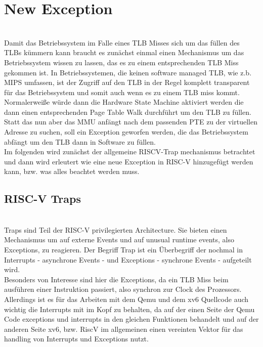 \section{New Exception}
\\
Damit das Betriebssystem im Falle eines TLB Misses sich um das füllen des TLBs kümmern kann
braucht es zunächst einmal einen Mechanismus um das Betriebssystem wissen zu lassen,
das es zu einem entsprechenden TLB Miss gekommen ist. In Betriebssystemen, die keinen
software managed TLB, wie z.b. MIPS \cite{MIPSArchitectureProgrammers2016} umfassen, ist der
Zugriff auf den TLB in der Regel komplett transparent für das Betriebssystem und somit auch wenn
es zu einem TLB miss kommt. Normalerweiße würde dann die Hardware State Machine aktiviert werden
die dann einen entsprechenden Page Table Walk durchführt um den TLB zu füllen.
\\
Statt das nun aber das MMU anfängt nach dem passenden PTE zu der virtuellen Adresse zu suchen,
soll ein Exception geworfen werden, die das Betriebssystem abfängt um den TLB dann in Software
zu füllen.\\
Im folgenden wird zunächst der allgemeine RISCV-Trap mechanismus betrachtet und dann
wird erleutert wie eine neue Exception in RISC-V hinzugefügt werden kann, bzw. was alles beachtet
werden muss.

\subsection{RISC-V Traps}
\\
Traps sind Teil der RISC-V privilegierten Architecture. Sie bieten einen Mechanismus
um auf externe Events und auf unusual runtime events, also Exceptions, zu reagieren\cite{riscvreader}.
Der Begriff Trap ist ein Überbegriff der nochmal in Interrupts - asynchrone Events - und
Exceptions - synchrone Events - aufgeteilt wird.\\
Besonders von Interesse sind hier die Exceptions, da ein TLB Miss beim ausführen einer Instruktion
passiert, also synchron zur Clock des Prozessors. Allerdings ist es für das Arbeiten mit
dem Qemu und dem xv6 Quellcode auch wichtig die Interrupts mit im Kopf zu behalten, da auf der
einen Seite der Qemu Code exceptions und interrupts in den gleichen Funktionen behandelt und
auf der anderen Seite xv6, bzw. RiscV im allgemeinen einen vereinten Vektor für das handling
von Interrupts und Exceptions nutzt\cite{RISCVInstructionSet}. \\


